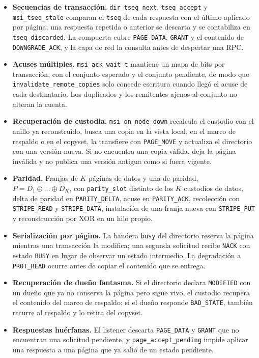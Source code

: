 \documentclass[11pt,spanish]{article}
\begin{document}
\begin{itemize}[leftmargin=1.5em, itemsep=0.3em]
    \item \textbf{Secuencias de transacción.} \texttt{dir\_tseq\_next}, \texttt{tseq\_accept} y \texttt{msi\_tseq\_stale} comparan el \texttt{tseq} de cada respuesta con el último aplicado por página; una respuesta repetida o anterior se descarta y se contabiliza en \texttt{tseq\_discarded}. La compuerta cubre \texttt{PAGE\_DATA}, \texttt{GRANT} y el contenido de \texttt{DOWNGRADE\_ACK}, y la capa de red la consulta antes de despertar una RPC.
    \item \textbf{Acuses múltiples.} \texttt{msi\_ack\_wait\_t} mantiene un mapa de bits por transacción, con el conjunto esperado y el conjunto pendiente, de modo que \texttt{invalidate\_remote\_copies} solo concede escritura cuando llegó el acuse de cada destinatario. Los duplicados y los remitentes ajenos al conjunto no alteran la cuenta.
    \item \textbf{Recuperación de custodia.} \texttt{msi\_on\_node\_down} recalcula el custodio con el anillo ya reconstruido, busca una copia en la vista local, en el marco de respaldo o en el copyset, la transfiere con \texttt{PAGE\_MOVE} y actualiza el directorio con una versión nueva. Si no encuentra una copia válida, deja la página inválida y no publica una versión antigua como si fuera vigente.
    \item \textbf{Paridad.} Franjas de $K$ páginas de datos y una de paridad, $P = D_1 \oplus \dots \oplus D_K$, con \texttt{parity\_slot} distinto de los $K$ custodios de datos, delta de paridad en \texttt{PARITY\_DELTA}, acuse en \texttt{PARITY\_ACK}, recolección con \texttt{STRIPE\_READ} y \texttt{STRIPE\_DATA}, instalación de una franja nueva con \texttt{STRIPE\_PUT} y reconstrucción por XOR en un hilo propio.
    \item \textbf{Serialización por página.} La bandera \texttt{busy} del directorio reserva la página mientras una transacción la modifica; una segunda solicitud recibe \texttt{NACK} con estado \texttt{BUSY} en lugar de observar un estado intermedio. La degradación a \texttt{PROT\_READ} ocurre antes de copiar el contenido que se entrega.
    \item \textbf{Recuperación de dueño fantasma.} Si el directorio declara \texttt{MODIFIED} con un dueño que ya no conserva la página pero sigue vivo, el custodio recupera el contenido del marco de respaldo; si el dueño responde \texttt{BAD\_STATE}, también recurre al respaldo y lo retira del copyset.
    \item \textbf{Respuestas huérfanas.} El listener descarta \texttt{PAGE\_DATA} y \texttt{GRANT} que no encuentran una solicitud pendiente, y \texttt{page\_accept\_pending} impide aplicar una respuesta a una página que ya salió de un estado pendiente.

\end{itemize}
\end{document}
